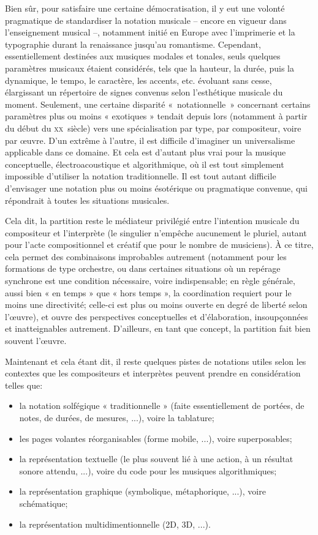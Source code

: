 Bien sûr, pour satisfaire une certaine démocratisation, il y eut une volonté pragmatique de standardiser la notation musicale -- encore en vigueur dans l'enseignement musical --, notamment initié en Europe avec l'imprimerie et la typographie durant la renaissance jusqu'au romantisme. Cependant, essentiellement destinées aux musiques modales et tonales, seuls quelques paramètres musicaux étaient considérés, tels que la hauteur, la durée, puis la dynamique, le tempo, le caractère, les accents, etc. évoluant sans cesse, élargissant un répertoire de signes convenus selon l'esthétique musicale du moment.  
Seulement, une certaine disparité \hbox{« no}tationnel\hbox{le »} concernant certains paramètres plus ou moins « exotiques » tendait depuis lors (notamment à partir du début du  \textsc{xx}\ieme ~siècle) vers une  spécialisation par type, par compositeur, voire par œuvre.
D'un extrême à l'autre, il est difficile d'imaginer un universalisme applicable dans ce domaine. Et cela est d'autant plus vrai pour la musique conceptuelle, électroacoustique et algorithmique, où il est tout simplement impossible d'utiliser la notation traditionnelle. Il est tout autant difficile d'envisager une notation plus ou moins ésotérique ou pragmatique convenue, qui répondrait à toutes les situations musicales.

Cela dit, la partition reste le médiateur privilégié entre l'intention musicale du compositeur et l'interprète (le singulier n'empêche aucunement le pluriel, autant pour l'acte compositionnel et créatif que pour le nombre de musiciens). À ce titre, cela permet des combinaisons improbables autrement (notamment pour les formations de type orchestre, ou dans certaines situations où un repérage synchrone est une condition nécessaire, voire indispensable; en règle générale, aussi bien « en temps » que « hors temps », la coordination requiert pour le moins une directivité; celle-ci est plus ou moins ouverte en degré de liberté selon l'œuvre), et ouvre des perspectives conceptuelles et d'élaboration, insoupçonnées et inatteignables autrement. D'ailleurs, en tant que concept, la partition fait bien souvent l'œuvre.  

\bigskip

Maintenant et cela étant dit, il reste quelques pistes de notations utiles selon les contextes que les compositeurs et interprètes peuvent prendre en considération telles que:

\begin{itemize}
\item la notation solfégique « traditionnelle » (faite essentiellement de portées, de notes, de durées, de mesures, ...), voire la tablature;
\item les pages volantes réorganisables  (forme mobile, ...), voire superposables;
\item la représentation textuelle (le plus souvent lié à une action, à un résultat sonore attendu, ...), voire du code pour les musiques algorithmiques;
\item la représentation graphique (symbolique, métaphorique, ...), voire schématique;
\item la représentation multidimentionnelle (2D, 3D, ...).
\end{itemize}

